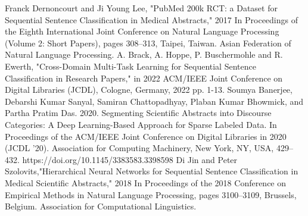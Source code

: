 \documentclass[12pt,a4paper]{report}     %
\begin{document}
\begin{normalsize}
{{\begin{normalsize}
{{\begin{thebibliography}{9}
 Franck Dernoncourt and Ji Young Lee, "PubMed 200k RCT: a Dataset for Sequential Sentence Classification in Medical Abstracts," 2017 In Proceedings of the Eighth International Joint Conference on Natural Language Processing (Volume 2: Short Papers), pages 308–313, Taipei, Taiwan. Asian Federation of Natural Language Processing.
 A. Brack, A. Hoppe, P. Buschermohle and R. Ewerth, "Cross-Domain Multi-Task Learning for Sequential Sentence Classification in Research Papers," in 2022 ACM/IEEE Joint Conference on Digital Libraries (JCDL), Cologne, Germany, 2022 pp. 1-13.
 Soumya Banerjee, Debarshi Kumar Sanyal, Samiran Chattopadhyay, Plaban Kumar Bhowmick, and Partha Pratim Das. 2020. Segmenting Scientific Abstracts into Discourse Categories: A Deep Learning-Based Approach for Sparse Labeled Data. In Proceedings of the ACM/IEEE Joint Conference on Digital Libraries in 2020 (JCDL '20). Association for Computing Machinery, New York, NY, USA, 429–432. https://doi.org/10.1145/3383583.3398598
 Di Jin and Peter Szolovits,"Hierarchical Neural Networks for Sequential Sentence Classification in Medical Scientific Abstracts," 2018 In Proceedings of the 2018 Conference on Empirical Methods in Natural Language Processing, pages 3100–3109, Brussels, Belgium. Association for Computational Linguistics.


\end{thebibliography}}}
\end{normalsize}}}
\end{normalsize}
\end{document}
